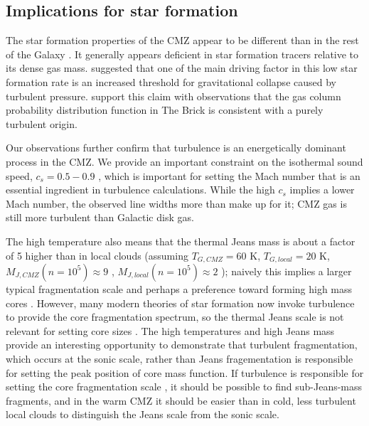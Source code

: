\subsection{Implications for star formation}
The star formation properties of the CMZ appear to be different than in the
rest of the Galaxy
\citep{Yusef-Zadeh2009a,Yusef-Zadeh2010a,Immer2012a,Longmore2013b}.  It
generally appears deficient in star formation tracers relative to its dense gas
mass.  \citet{Kruijssen2014c} suggested that one of the main driving factor in
this low star formation rate is an increased threshold for gravitational
collapse caused by turbulent pressure.  \citet{Rathborne2014b} support this
claim with observations that the gas column probability distribution function
in The Brick is consistent with a purely turbulent origin.

Our observations further confirm that turbulence is an energetically dominant
process in the CMZ.  We provide an important constraint on the isothermal sound
speed, $c_s = 0.5-0.9$ \kms, which is important for setting the Mach number
that is an essential ingredient in turbulence calculations.  While the high
$c_s$ implies a lower Mach number, the observed line widths more than make up
for it; CMZ gas is still more turbulent than Galactic disk gas.

The high temperature also means that the thermal Jeans mass is about a factor
of 5 higher than in local clouds (assuming $T_{G,CMZ}=60$ K, $T_{G,local}=20$ K,
$M_{J,CMZ}(n=10^5) \approx 9$ \msun, $M_{J,local}(n=10^5) \approx 2$ \msun);
naively this implies a larger typical fragmentation scale and perhaps a
preference toward forming high mass cores \citep{Larson2005a}.  However, many
modern theories of star formation now invoke turbulence to provide the core
fragmentation spectrum, so the thermal Jeans scale is not relevant for setting
core sizes 
\citep{Krumholz2005c,Hennebelle2011a,Padoan2011b,Federrath2012a,Hennebelle2013a,Hopkins2013a}.
The high temperatures and high Jeans mass provide an interesting opportunity to
demonstrate that turbulent fragmentation, which occurs at the sonic scale,
rather than Jeans fragementation is responsible for setting the peak position
of core mass function.  If turbulence is responsible for setting the core
fragmentation scale \citep{Offner2013b,Hopkins2013a}, it
should be possible to find sub-Jeans-mass fragments, and in the warm CMZ it
should be easier than in cold, less turbulent local clouds to distinguish the
Jeans scale from the sonic scale.

